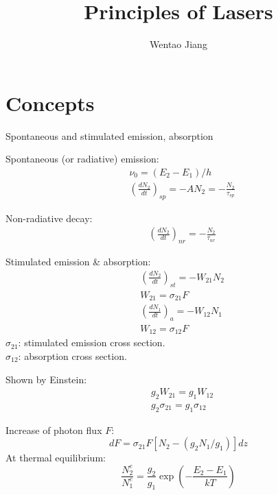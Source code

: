 \documentclass[8pt,a4paper,twocolumn]{article} %
\numberwithin{equation}{section} %
\begin{document}
\small
	\title{Principles of Lasers}
	\author{Wentao Jiang}
	\date{}
	\maketitle
	\tableofcontents

	\section{Concepts} %
	\label{sec:concepts}
		Spontaneous and stimulated emission, absorption

		Spontaneous (or radiative) emission:  
		\begin{align}
			&\nu_0 = (E_2-E_1)/h \\
			&\left( \frac{dN_2}{dt} \right)_{sp} = -AN_2 = -\frac{N_2}{\tau_{sp}}			
		\end{align}

		Non-radiative decay:
		\begin{align}
			&\left( \frac{dN_2}{dt} \right)_{nr}  = -\frac{N_2}{\tau_{nr}}
		\end{align}

		Stimulated emission \& absorption:
		\begin{align}
			&\left( \frac{dN_2}{dt} \right)_{st}  = -W_{21}N_2\\
			&W_{21}=\sigma_{21}F\\
			&\left( \frac{dN_1}{dt} \right)_{a}  = -W_{12}N_1\\
			&W_{12}=\sigma_{12}F
		\end{align}
		$\sigma_{21} $: stimulated emission cross section.\\
		$\sigma_{12} $: absorption cross section.

		Shown by Einstein:
		\begin{align}
			&g_2W_{21}=g_1W_{12}\\
			&g_2 \sigma_{21}=g_1 \sigma_{12}
		\end{align}

		Increase of photon flux $F$:
		\begin{equation}
			dF=\sigma_{21}F [N_2-(g_2N_1/g_1)]dz
		\end{equation}
		At thermal equilibrium:
		\begin{equation}
			\frac{N^e_2}{N^e_1}=\frac{g_2}{g_1}\exp\left( -\frac{E_2-E_1}{kT} \right)
		\end{equation}
\end{document}
